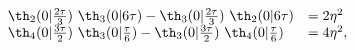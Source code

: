 \begin{equation}
    \begin{array}{ll}
  \th_2(0|{2\tau\over 3})~\th_3(0|6\tau) -\th_3(0|{2\tau\over
  3})~\th_2(0|6\tau) &= 2 \eta^2 \\  
  \th_4(0|{3\tau\over 2})~\th_3(0|{\tau\over 6}) -\th_3(0|{3\tau\over
  2})~\th_4(0|{\tau\over 6}) &= 4 \eta^2,
    \end{array}
  \end{equation}

